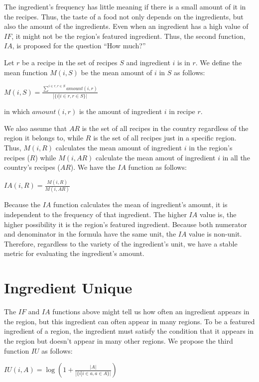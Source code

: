 The ingredient's frequency has little meaning if there is a small amount of it in the recipes. Thus, the taste of a food not only depends on the ingredients, but also the amount of the ingredients. Even when an ingredient has a high value of $IF$, it might not be the region's featured ingredient. Thus, the second function, $IA$, is proposed for the question ``How much?''

Let $r$ be a recipe in the set of recipes $S$ and ingredient $i$ is in $r$. 
We define the mean function $M(i,S)$ be the mean amount of $i$ in $S$ as follows: 
\begin{center}
\smallskip
$M(i,S)= \frac{\displaystyle \sum_{}^{i \in r, r \in S} amount(i,r)}{\displaystyle |\{i|i \in r, r \in S\}|}$
\smallskip
\end{center}

in which $amount(i,r)$ is the amount of ingredient $i$ in recipe $r$.

We also assume that $AR$ is the set of all recipes in the country regardless of the region it belongs to, while $R$ is the set of all recipes just in a specific region. Thus, $M(i,R)$ calculates the mean amount of ingredient $i$ in the region's recipes ($R$) while $M(i,AR)$ calculate the mean amout of ingredient $i$ in all the country's recipes ($AR$). We have the $IA$ function as follows:
\begin{center}
\smallskip
$IA(i,R)= \frac{\displaystyle M(i,R)}{\displaystyle M(i,AR)}$
\smallskip
\end{center}


Because the $IA$ function calculates the mean of ingredient's amount, it is independent to the frequency of that ingredient. The higher $IA$ value is, the higher possibility it is the region's featured ingredient. Because both numerator and denominator in the formula have the same unit, the $IA$ value is non-unit. Therefore, regardless to the variety of the ingredient's unit, we have a stable metric for evaluating the ingredient's amount.

\section{Ingredient Unique}

The $IF$ and $IA$ functions above might tell us how often an ingredient appears in the region, but this ingredient can often appear in many regions. To be a featured ingredient of a region, the ingredient must satisfy the condition that it appears in the region but doesn't appear in many other regions. We propose the third function $IU$ as follows: 
\begin{center}
\smallskip
$IU(i,A)=  \log{(\displaystyle 1+ \frac{\displaystyle |A|}{\displaystyle |\{i|i \in a, a \in A \}|})}$
\smallskip
\end{center}

